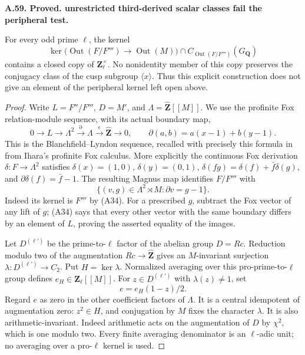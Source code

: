\documentclass[11pt,oneside]{article}
\makeatletter
\newcounter{statementanchor}
\newenvironment{statement}[3]{%
 \refstepcounter{statementanchor}\def\@currentlabel{#1}%
 \par\addvspace{9pt}\noindent
 \textbf{#1. #2. #3.}\par\nobreak\noindent\ignorespaces
}{\par\addvspace{5pt}}
\makeatother
\begin{document}
\begin{statement}{A.59}{Proved}{unrestricted third-derived scalar classes fail the peripheral test}
\label{st:A.59}
\label{A:last-layer-unrestricted}
For every odd prime $\ell$, the kernel
\[
 \ker\bigl(\operatorname{Out}(F/F''')\to\operatorname{Out}(M)\bigr)
       \cap C_{\operatorname{Out}(F/F''')}(G_{\mathbf Q})
\]
contains a closed copy of $\mathbf Z_\ell^\times$.
No nonidentity member of this copy preserves the
conjugacy class of the cusp subgroup $\langle x\rangle$.
Thus this explicit construction does not give an element
of the peripheral kernel left open above.
\end{statement}
\begin{proof}
Write $L=F''/F'''$, $D=M'$, and
$\Lambda=\widehat{\mathbf Z}[[M]]$.
We use the profinite Fox relation-module sequence,
with its actual boundary map,
\[
 0\longrightarrow L\longrightarrow\Lambda^2
   \xrightarrow{\partial}\Lambda
   \xrightarrow\epsilon\widehat{\mathbf Z}\longrightarrow0,
 \qquad \partial(a,b)=a(x-1)+b(y-1).                         \tag{A34}
\]
This is the Blanchfield--Lyndon sequence, recalled
with precisely this formula in
\cite[Proposition 1.1]{A_Yamaguchi2026Centers} from
Ihara's profinite Fox calculus. More explicitly the
continuous Fox derivation $\delta:F\to\Lambda^2$
satisfies $\delta(x)=(1,0)$, $\delta(y)=(0,1)$,
$\delta(fg)=\delta(f)+\bar f\delta(g)$, and
$\partial\delta(f)=\bar f-1$.
The resulting Magnus map identifies $F/F'''$ with
\[
 \{(v,g)\in\Lambda^2\rtimes M:\partial v=g-1\}.             \tag{A35}
\]
Indeed its kernel is $F'''$ by (A34). For a prescribed
$g$, subtract the Fox vector of any lift of $g$;
(A34) says that every other vector with the same
boundary differs by an element of $L$, proving the
asserted equality of the images.

Let $D^{(\ell')}$ be the prime-to-$\ell$ factor of
the abelian group $D=Rc$. Reduction modulo two of
the augmentation $Rc\to\widehat{\mathbf Z}$ gives
an $M$-invariant surjection
$\lambda:D^{(\ell')}\to C_2$. Put $H=\ker\lambda$.
Normalized averaging over this pro-prime-to-$\ell$
group defines $e_H\in\mathbf Z_\ell[[M]]$.
For $z\in D^{(\ell')}$ with $\lambda(z)\ne1$, set
\[
                   e=e_H(1-z)/2.
\]
Regard $e$ as zero in the other coefficient factors
of $\Lambda$. It is a central idempotent of augmentation
zero: $z^2\in H$, and conjugation by $M$ fixes the
character $\lambda$. It is also arithmetic-invariant.
Indeed arithmetic acts on the augmentation of $D$
by $\chi^2$, which is one modulo two. Every finite
averaging denominator is an $\ell$-adic unit; no
averaging over a pro-$\ell$ kernel is used.


\end{proof}
\end{document}
